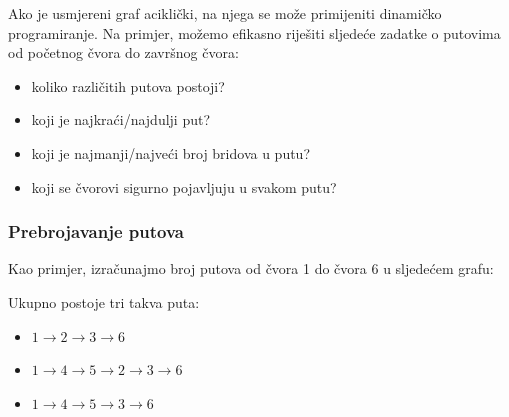 Ako je usmjereni graf aciklički,
na njega se može primijeniti dinamičko programiranje.
Na primjer, možemo efikasno riješiti sljedeće
zadatke o putovima od početnog čvora
do završnog čvora:

\begin{itemize}
\item koliko različitih putova postoji?
\item koji je najkraći/najdulji put?
\item koji je najmanji/najveći broj bridova u putu?
\item koji se čvorovi sigurno pojavljuju u svakom putu?
\end{itemize}

\subsubsection{Prebrojavanje putova}

Kao primjer, izračunajmo broj putova
od čvora 1 do čvora 6 u sljedećem grafu:

\begin{center}
\end{center}
Ukupno postoje tri takva puta:
\begin{itemize}
\item $1 \rightarrow 2 \rightarrow 3 \rightarrow 6$
\item $1 \rightarrow 4 \rightarrow 5 \rightarrow 2 \rightarrow 3 \rightarrow 6$
\item $1 \rightarrow 4 \rightarrow 5 \rightarrow 3 \rightarrow 6$
\end{itemize}

